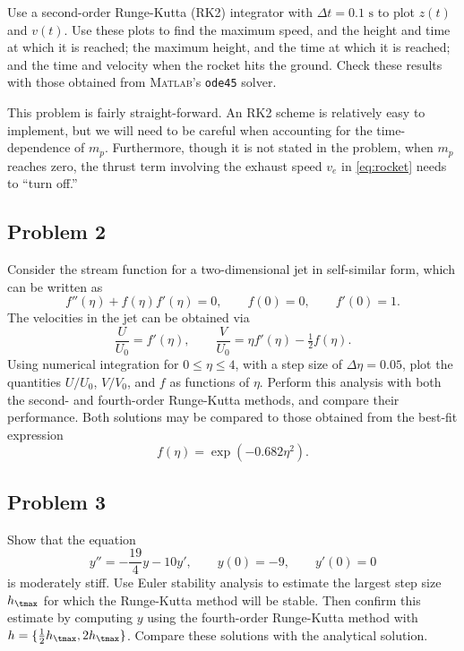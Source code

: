 \documentclass[12pt]{article}
\begin{document}
Use a second-order Runge-Kutta (RK2) integrator with $\Delta t = 0.1 \text{ s}$ to plot $z(t)$ and $v(t)$. Use these plots to find the maximum speed, and the height and time at which it is reached; the maximum height, and the time at which it is reached; and the time and velocity when the rocket hits the ground. Check these results with those obtained from \textsc{Matlab}'s \lstinline|ode45| solver.

This problem is fairly straight-forward. An RK2 scheme is relatively easy to implement, but we will need to be careful when accounting for the time-dependence of $m_p$. Furthermore, though it is not stated in the problem, when $m_p$ reaches zero, the thrust term involving the exhaust speed $v_e$ in \eqref{eq:rocket} needs to ``turn off.''

\subsection{Problem 2}

Consider the stream function for a two-dimensional jet in self-similar form, which can be written as
\begin{equation}
f''(\eta) + f(\eta) f'(\eta) = 0 ,\qquad
f(0) = 0 ,\qquad
f'(0) = 1
.
\end{equation}
The velocities in the jet can be obtained via
\begin{equation}
\frac{U}{U_0} = f'(\eta) ,\qquad
\frac{V}{U_0} = \eta f'(\eta) - \tfrac{1}{2} f(\eta)
.
\end{equation}
Using numerical integration for $0 \le \eta \le 4$, with a step size of $\Delta \eta = 0.05$, plot the quantities $U/U_0$, $V/V_0$, and $f$ as functions of $\eta$. Perform this analysis with both the second- and fourth-order Runge-Kutta methods, and compare their performance. Both solutions may be compared to those obtained from the best-fit expression
\begin{equation}
f(\eta) = \exp(-0.682 \eta^2)
.
\end{equation}

\subsection{Problem 3}

Show that the equation
\begin{equation}
y'' = -\frac{19}{4} y - 10 y' ,\qquad
y(0) = -9 ,\qquad
y'(0) = 0
\end{equation}
is moderately stiff. Use Euler stability analysis to estimate the largest step size $h_\tmax$ for which the Runge-Kutta method will be stable. Then confirm this estimate by computing $y$ using the fourth-order Runge-Kutta method with $h = \{ \tfrac{1}{2} h_\tmax, 2 h_\tmax\}$. Compare these solutions with the analytical solution.
\end{document}

